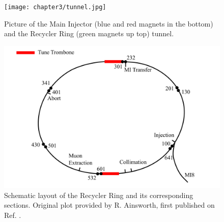\begin{figure}[H]
   \centering
   \texttt{[image: chapter3/tunnel.jpg]}
   \caption{Picture of the Main Injector (blue and red magnets in the bottom) and the Recycler Ring (green magnets up top) tunnel.}
   \label{fig:rrtunnel}
\end{figure}


\cite{pipII1} \cite{rr2} \cite{fermi_rookie}

\begin{figure}[H]
   \centering
   \includegraphics[width=\columnwidth]{chapter3/RRschematic.png}
   \caption{Schematic layout of the Recycler Ring and its corresponding sections. Original plot provided by R. Ainsworth, first published on Ref. \cite{rr1}.}
   \label{fig:rrschematic}
\end{figure}


